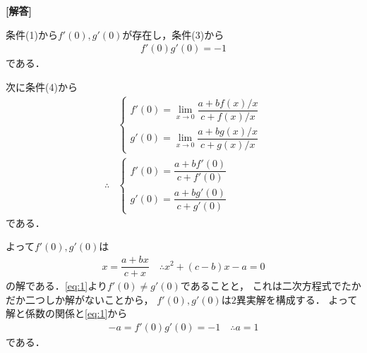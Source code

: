 \documentclass[../../main.tex]{subfiles}
\begin{document}
\begin{oframed}
  
\end{oframed}

{\bf [解答]}

条件(1)から$f'(0), g'(0)$が存在し，条件(3)から
\begin{align}
  f'(0)g'(0) = -1 \label{eq:1}
\end{align}
である．

次に条件(4)から
\begin{align}
  &
  \begin{cases}
    f'(0)=\lim_{x\to0}\dfrac{a+bf(x)/x}{c+f(x)/x} \\
    g'(0)=\lim_{x\to0}\dfrac{a+bg(x)/x}{c+g(x)/x}
  \end{cases} \\
  \therefore
  &
  \begin{cases}
    f'(0)=\dfrac{a+bf'(0)}{c+f'(0)} \\
    g'(0)=\dfrac{a+bg'(0)}{c+g'(0)}
  \end{cases}
\end{align}
である．

よって$f'(0),g'(0)$は
\begin{align}
  x = \dfrac{a+bx}{c+x}
  \quad \therefore
  x^2 + (c-b)x -a = 0 \label{eq:2}
\end{align}
の解である．\cref{eq:1}より$f'(0)\neq g'(0)$であることと，
これは二次方程式でたかだか二つしか解がないことから，
$f'(0), g'(0)$は$2$異実解を構成する．
よって解と係数の関係と\cref{eq:1}から
\begin{align}
  -a = f'(0)g'(0) = -1
  \quad\therefore
  a = 1
\end{align}
である．

\newpage
\end{document}

